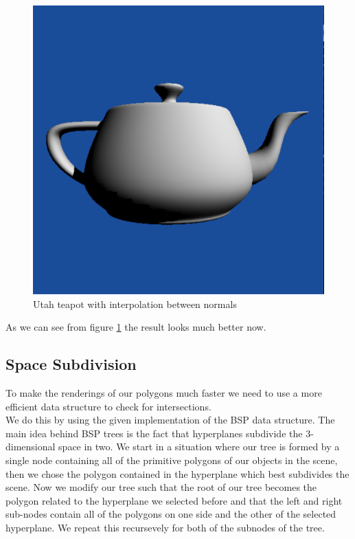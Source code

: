 \begin{figure}[H]
	\centering
	\includegraphics[scale=\imagescale]{images/worksheet_4/part_5}
	\caption{Utah teapot with interpolation between normals}
	\label{fig:utah_interpolation}
\end{figure}
As we can see from figure \ref{fig:utah_interpolation} the result looks much better now.
\subsection{Space Subdivision}
To make the renderings of our polygons much faster we need to use a more efficient data structure to check for intersections.\\
We do this by using the given implementation of the BSP data structure. The main idea behind BSP trees is the fact that hyperplanes subdivide the 3-dimensional space in two. We start in a situation where our tree is formed by a single node containing all of the primitive polygons of our objects in the scene, then we chose the polygon contained in the hyperplane which best subdivides the scene. Now we modify our tree such that the root of our tree becomes the polygon related to the hyperplane we selected before and that  the left and right sub-nodes contain all of the polygons on one side and the other of the selected hyperplane. We repeat this recursevely for both of the subnodes of the tree.



